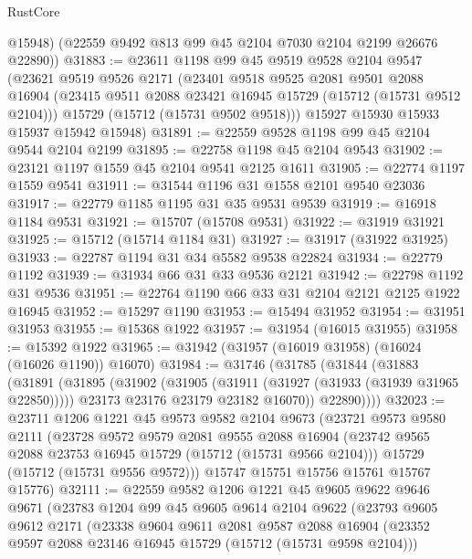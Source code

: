 \begin{lexlean}{RustCore}
\begin{coremodule}
        @15948)
      (@22559 @9492 @813 @99 @45 @2104 @7030 @2104 @2199 @26676 @22890))
@31883 := @23611
    @1198
    @99
    @45
    @9519
    @9528
    @2104
    @9547
    (@23621
      @9519
      @9526
      @2171
      (@23401
        @9518
        @9525
        @2081
        @9501
        @2088
        @16904
        (@23415 @9511 @2088 @23421 @16945 @15729 (@15712 (@15731 @9512 @2104)))
        @15729
        (@15712 (@15731 @9502 @9518)))
      @15927
      @15930
      @15933
      @15937
      @15942
      @15948)
@31891 := @22559 @9528 @1198 @99 @45 @2104 @9544 @2104 @2199
@31895 := @22758 @1198 @45 @2104 @9543
@31902 := @23121 @1197 @1559 @45 @2104 @9541 @2125 @1611
@31905 := @22774 @1197 @1559 @9541
@31911 := @31544 @1196 @31 @1558 @2101 @9540 @23036
@31917 := @22779 @1185 @1195 @31 @35 @9531 @9539
@31919 := @16918 @1184 @9531
@31921 := @15707 (@15708 @9531)
@31922 := @31919 @31921
@31925 := @15712 (@15714 @1184 @31)
@31927 := @31917 (@31922 @31925)
@31933 := @22787 @1194 @31 @34 @5582 @9538 @22824
@31934 := @22779 @1192
@31939 := @31934 @66 @31 @33 @9536 @2121
@31942 := @22798 @1192 @31 @9536
@31951 := @22764 @1190 @66 @33 @31 @2104 @2121 @2125 @1922 @16945
@31952 := @15297 @1190
@31953 := @15494 @31952
@31954 := @31951 @31953
@31955 := @15368 @1922
@31957 := @31954 (@16015 @31955)
@31958 := @15392 @1922
@31965 := @31942 (@31957 (@16019 @31958) (@16024 (@16026 @1190)) @16070)
@31984 := @31746
    (@31785
      (@31844
        (@31883
          (@31891
            (@31895
              (@31902
                (@31905 (@31911 (@31927 (@31933 (@31939 @31965 @22850)))))
                @23173
                @23176
                @23179
                @23182
                @16070))
            @22890))))
@32023 := @23711
    @1206
    @1221
    @45
    @9573
    @9582
    @2104
    @9673
    (@23721
      @9573
      @9580
      @2111
      (@23728
        @9572
        @9579
        @2081
        @9555
        @2088
        @16904
        (@23742 @9565 @2088 @23753 @16945 @15729 (@15712 (@15731 @9566 @2104)))
        @15729
        (@15712 (@15731 @9556 @9572)))
      @15747
      @15751
      @15756
      @15761
      @15767
      @15776)
@32111 := @22559
    @9582
    @1206
    @1221
    @45
    @9605
    @9622
    @9646
    @9671
    (@23783
      @1204
      @99
      @45
      @9605
      @9614
      @2104
      @9622
      (@23793
        @9605
        @9612
        @2171
        (@23338
          @9604
          @9611
          @2081
          @9587
          @2088
          @16904
          (@23352 @9597 @2088 @23146 @16945 @15729 (@15712 (@15731 @9598 @2104)))

\end{coremodule}
\end{lexlean}
